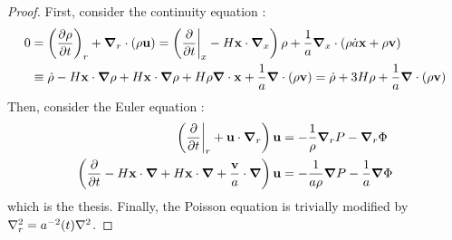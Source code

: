 \begin{proofbox}
  \begin{proof}
    First, consider the continuity equation :
    \begin{equation*}
      \begin{split}
        0
        & = \left( \frac{\partial \rho}{\partial t} \right)_r + \boldsymbol{\nabla}_r \cdot (\rho \mathbf{u}) = \left( \frac{\partial}{\partial t} \bigg\vert_x - H \mathbf{x} \cdot \boldsymbol{\nabla}_x \right) \rho + \frac{1}{a} \boldsymbol{\nabla}_x \cdot (\rho \dot{a} \mathbf{x} + \rho \mathbf{v}) \\
        & \equiv \dot{\rho} - H \mathbf{x} \cdot \boldsymbol{\nabla} \rho + H \mathbf{x} \cdot \boldsymbol{\nabla} \rho + H \rho \boldsymbol{\nabla}\cdot \mathbf{x} + \frac{1}{a} \boldsymbol{\nabla}\cdot (\rho \mathbf{v}) = \dot{\rho} + 3 H \rho + \frac{1}{a} \boldsymbol{\nabla}\cdot (\rho \mathbf{v})
      \end{split}
    \end{equation*}
    Then, consider the Euler equation :
    \begin{equation*}
      \begin{split}
        \left( \frac{\partial}{\partial t} \bigg\vert_r + \mathbf{u} \cdot \boldsymbol{\nabla}_r \right) \mathbf{u} & = - \frac{1}{\rho} \boldsymbol{\nabla}_r P - \boldsymbol{\nabla}_r \Phi \\
        \left( \frac{\partial}{\partial t} - H \mathbf{x} \cdot \boldsymbol{\nabla} + H \mathbf{x} \cdot \boldsymbol{\nabla} + \frac{\mathbf{v}}{a} \cdot \boldsymbol{\nabla} \right) \mathbf{u} & = - \frac{1}{a \rho} \boldsymbol{\nabla} P - \frac{1}{a} \boldsymbol{\nabla} \Phi
      \end{split}
    \end{equation*}
    which is the thesis. Finally, the Poisson equation is trivially modified by $ \nabla^2_r = a^{-2}(t) \nabla^2 $.
  \end{proof}
\end{proofbox}

